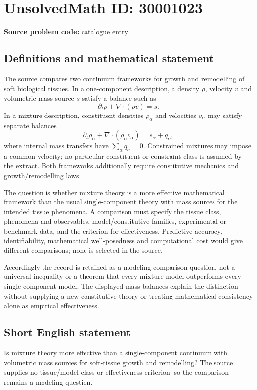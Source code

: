 \documentclass[11pt]{article}
\begin{document}
\section*{UnsolvedMath ID: 30001023}
\textbf{Source problem code:} catalogue entry
\subsection{Definitions and mathematical statement}
The source compares two continuum frameworks for growth and remodelling of soft biological tissues. In a one-component description, a density $\rho$, velocity $v$ and volumetric mass source $s$ satisfy a balance such as
\[
\partial_t\rho+\nabla\!\cdot(\rho v)=s.
\]
In a mixture description, constituent densities $\rho_\alpha$ and velocities $v_\alpha$ may satisfy separate balances
\[
\partial_t\rho_\alpha+\nabla\!\cdot(\rho_\alpha v_\alpha)
=s_\alpha+q_\alpha,
\]
where internal mass transfers have $\sum_\alpha q_\alpha=0$. Constrained mixtures may impose a common velocity; no particular constituent or constraint class is assumed by the extract. Both frameworks additionally require constitutive mechanics and growth/remodelling laws.

The question is whether mixture theory is a more effective mathematical framework than the usual single-component theory with mass sources for the intended tissue phenomena. A comparison must specify the tissue class, phenomena and observables, model/constitutive families, experimental or benchmark data, and the criterion for effectiveness. Predictive accuracy, identifiability, mathematical well-posedness and computational cost would give different comparisons; none is selected in the source.

Accordingly the record is retained as a modeling-comparison question, not a universal inequality or a theorem that every mixture model outperforms every single-component model. The displayed mass balances explain the distinction without supplying a new constitutive theory or treating mathematical consistency alone as empirical effectiveness.
\subsection{Short English statement}
Is mixture theory more effective than a single-component continuum with volumetric mass sources for soft-tissue growth and remodelling? The source supplies no tissue/model class or effectiveness criterion, so the comparison remains a modeling question.
\end{document}

